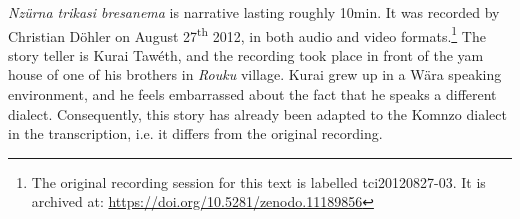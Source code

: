 \textit{Nzürna trikasi bresanema} is narrative lasting roughly 10min. It was recorded by Christian Döhler on August 27\textsuperscript{th} 2012, in both audio and video formats.\footnote{The original recording session for this text is labelled tci20120827-03. It is archived at: \href{https://doi.org/10.5281/zenodo.11189856}{https://doi.org/10.5281/zenodo.11189856}} The story teller is Kurai Tawéth, and the recording took place in front of the yam house of one of his brothers in \textit{Rouku} village. Kurai grew up in a Wära speaking environment, and he feels embarrassed about the fact that he speaks a different dialect. Consequently, this story has already been adapted to the Komnzo dialect in the transcription, i.e. it differs from the original recording.